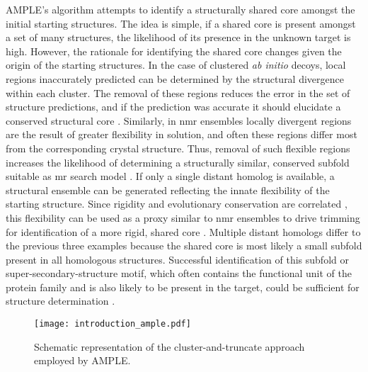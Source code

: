 AMPLE's algorithm attempts to identify a structurally shared core amongst the initial starting structures. The idea is simple, if a shared core is present amongst a set of many structures, the likelihood of its presence in the unknown target is high. However, the rationale for identifying the shared core changes given the origin of the starting structures. In the case of clustered \textit{ab initio} decoys, local regions inaccurately predicted can be determined by the structural divergence within each cluster. The removal of these regions reduces the error in the set of structure predictions, and if the prediction was accurate it should elucidate a conserved structural core \cite{Bibby2012-lm}. Similarly, in \gls{nmr} ensembles locally divergent regions are the result of greater flexibility in solution, and often these regions differ most from the corresponding crystal structure. Thus, removal of such flexible regions increases the likelihood of determining a structurally similar, conserved subfold suitable as \gls{mr} search model \cite{Bibby2013-cp}. If only a single distant homolog is available, a structural ensemble can be generated reflecting the innate flexibility of the starting structure. Since rigidity and evolutionary conservation are correlated \cite{Yeh2014-vl,Shih2012-gh}, this flexibility can be used as a proxy similar to \gls{nmr} ensembles to drive trimming for identification of a more rigid, shared core \cite{Rigden2018-zt}. Multiple distant homologs differ to the previous three examples because the shared core is most likely a small subfold present in all homologous structures. Successful identification of this subfold or super-secondary-structure motif, which often contains the functional unit of the protein family and is also likely to be present in the target, could be sufficient for structure determination \cite{Bruhn2014-aa,Hotta2014-me}. 

\begin{figure}[H]
    \centering
    \texttt{[image: introduction\_ample.pdf]}
    \caption[Cluster-and-truncate approach employed by AMPLE]{Schematic representation of the cluster-and-truncate approach employed by AMPLE.}
    \label{fig:introduction_ample}
\end{figure}

